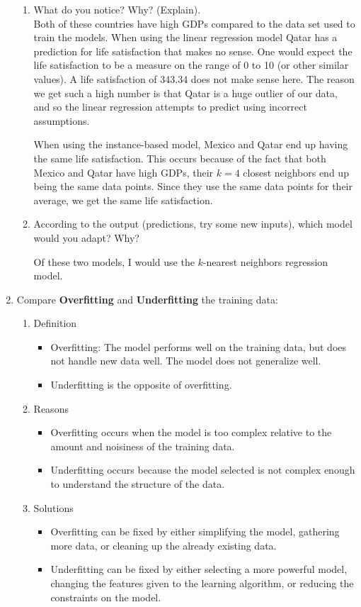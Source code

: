 \documentclass[a4paper,10pt]{article}
\begin{document}
\begin{enumerate}
\begin{enumerate}
		\item What do you notice? Why? (Explain). \\
			Both of these countries have high GDPs compared to the data set used to train the models.
			When using the linear regression model Qatar has a prediction for life satisfaction that makes no sense.
			One would expect the life satisfaction to be a measure on the range of 0 to 10 (or other similar values).
			A life satisfaction of 343.34 does not make sense here.
			The reason we get such a high number is that Qatar is a huge outlier of our data, and so the linear regression attempts to predict using incorrect assumptions.
			
			When using the instance-based model, Mexico and Qatar end up having the same life satisfaction.
			This occurs because of the fact that both Mexico and Qatar have high GDPs, their \( k=4 \) closest neighbors end up being the same data points.
			Since they use the same data points for their average, we get the same life satisfaction.
			
		\item According to the output (predictions, try some new inputs), which model would you adapt? Why?
		
		Of these two models, I would use the \( k \)-nearest neighbors regression model. 
	\end{enumerate}
	
	\item Compare \textbf{Overfitting} and \textbf{Underfitting} the training data:
	\begin{enumerate}
		\item Definition
		\begin{itemize}
			\item Overfitting: The model performs well on the training data, but does not handle new data well. The model does not generalize well.
			\item Underfitting is the opposite of overfitting. 
		\end{itemize}
		\item Reasons
		\begin{itemize}
			\item Overfitting occurs when the model is too complex relative to the amount and noisiness of the training data.
			\item Underfitting occurs because the model selected is not complex enough to understand the structure of the data.
		\end{itemize}
		\item Solutions
		\begin{itemize}
			\item Overfitting can be fixed by either simplifying the model, gathering more data, or cleaning up the already existing data.
			\item Underfitting can be fixed by either selecting a more powerful model, changing the features given to the learning algorithm, or reducing the constraints on the model.
		\end{itemize}
	\end{enumerate}
	

\end{enumerate}
\end{document}

